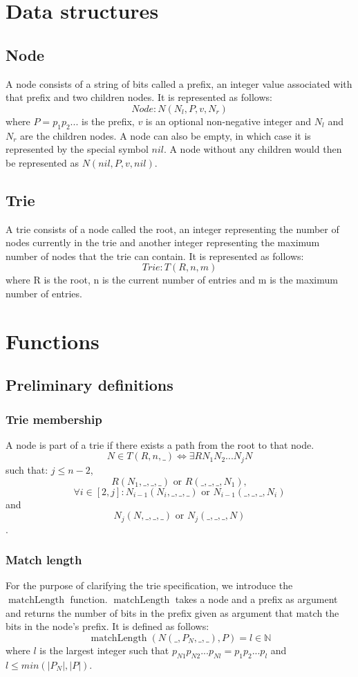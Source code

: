 \documentclass{article}
\DeclareMathOperator{\matchlength}{matchLength}
\begin{document}
\section{Data structures}
\subsection{Node}
A node consists of a string of bits called a prefix, an integer value
associated with that prefix and two children nodes. It is represented
as follows:
\[
    Node: N(N_l, P, v, N_r)
\]
where $P = p_1p_2...$ is the prefix, $v$ is an optional non-negative integer and
$N_l$ and $N_r$ are the children nodes. A node can also be empty, in which case
it is represented by the special symbol $nil$. A node without any children would
then be represented as $N(nil, P, v, nil)$.
\subsection{Trie}
A trie consists of a node called the root, an integer representing the
number of nodes currently in the trie and another integer representing the
maximum number of nodes that the trie can contain. It is represented as follows:
\[
    Trie: T(R, n, m)
\]
where R is the root, n is the current number of entries and m is the maximum
number of entries.
\section{Functions}
\subsection{Preliminary definitions}
\subsubsection{Trie membership}
A node is part of a trie if there exists a path from the root to that node.
\[
    N \in T(R, n, \_) \Leftrightarrow \exists RN_1N_2...N_jN
\]
such that: $j \leq n-2$,
\[
    R(N_1, \_, \_, \_) \text{ or } R(\_, \_, \_, N_1),
\]
\[
    \forall i \in [2, j]: N_{i-1}(N_i, \_, \_, \_) \text{ or } N_{i-1}(\_, \_, \_, N_i)
\]
and
\[
    N_j(N, \_, \_, \_) \text{ or } N_j(\_, \_, \_, N)
\].
\subsubsection{Match length}
For the purpose of clarifying the trie specification, we introduce the
$\matchlength$ function. $\matchlength$ takes a node and a prefix as argument and
returns the number of bits in the prefix given as argument that match the
bits in the node's prefix. It is defined as follows:
\[
    \matchlength(N(\_, P_N, \_, \_), P) = l \in \mathbb{N}
\]
where $l$ is the largest integer such that $p_{N1}p_{N2}...p_{Nl} = p_1p_2...p_l$
and $l \leq min(|P_N|, |P|)$.
\end{document}

